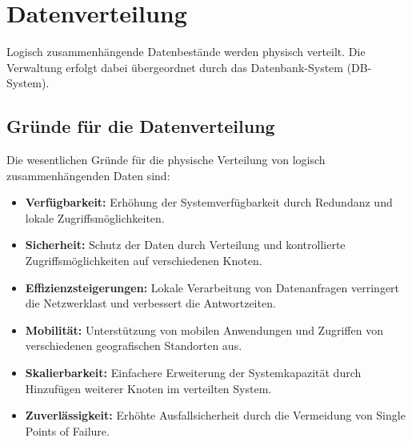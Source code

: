 \section{Datenverteilung}
Logisch zusammenhängende Datenbestände werden physisch verteilt. Die Verwaltung erfolgt dabei übergeordnet durch das Datenbank-System (DB-System).

\subsection{Gründe für die Datenverteilung}
Die wesentlichen Gründe für die physische Verteilung von logisch zusammenhängenden Daten sind:

\begin{itemize}
    \item \textbf{Verfügbarkeit:} Erhöhung der Systemverfügbarkeit durch Redundanz und lokale Zugriffsmöglichkeiten.
    \item \textbf{Sicherheit:} Schutz der Daten durch Verteilung und kontrollierte Zugriffsmöglichkeiten auf verschiedenen Knoten.
    \item \textbf{Effizienzsteigerungen:} Lokale Verarbeitung von Datenanfragen verringert die Netzwerklast und verbessert die Antwortzeiten.
    \item \textbf{Mobilität:} Unterstützung von mobilen Anwendungen und Zugriffen von verschiedenen geografischen Standorten aus.
    \item \textbf{Skalierbarkeit:} Einfachere Erweiterung der Systemkapazität durch Hinzufügen weiterer Knoten im verteilten System.
    \item \textbf{Zuverlässigkeit:} Erhöhte Ausfallsicherheit durch die Vermeidung von Single Points of Failure.
\end{itemize}

\newpage

